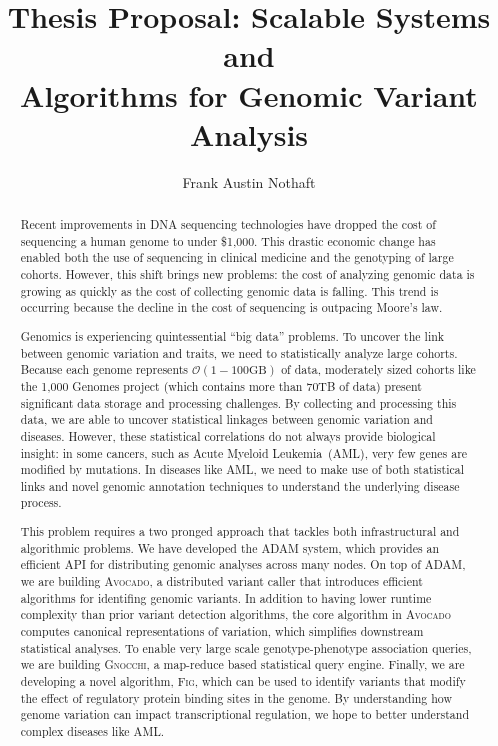\documentclass[11pt]{article} %
\begin{document}
\title{Thesis Proposal: Scalable Systems and \\ Algorithms for Genomic Variant Analysis}
\author{Frank Austin Nothaft} 
\date{}

\maketitle

\begin{abstract}

Recent improvements in DNA sequencing technologies have dropped the cost of sequencing a
human genome to under \$1,000. This drastic economic change has enabled both the use of
sequencing in clinical medicine and the genotyping of large cohorts. However, this shift
brings new problems: the cost of analyzing genomic data is growing as quickly as the cost
of collecting genomic data is falling. This trend is occurring because the decline in the
cost of sequencing is outpacing Moore's law.

Genomics is experiencing quintessential ``big data'' problems. To uncover the link between
genomic variation and traits, we need to statistically analyze large cohorts. Because each
genome represents $\mathcal{O}(1-100\text{GB})$ of data, moderately sized cohorts like the
1,000 Genomes project (which contains more than 70TB of data) present significant data
storage and processing challenges. By collecting and processing this data, we are able to
uncover statistical linkages between genomic variation and diseases. However, these statistical
correlations do not always provide biological insight: in some cancers, such as Acute
Myeloid Leukemia~(AML), very few genes are modified by mutations. In diseases like AML,
we need to make use of both statistical links and novel genomic annotation techniques to
understand the underlying disease process.

This problem requires a two pronged approach that tackles both infrastructural and
algorithmic problems. We have developed the \textsc{ADAM} system, which provides an efficient
API for distributing genomic analyses across many nodes. On top of \textsc{ADAM}, we are
building \textsc{Avocado}, a distributed variant caller that introduces efficient algorithms
for identifing genomic variants. In addition to having lower runtime complexity than prior
variant detection algorithms, the core algorithm in \textsc{Avocado} computes canonical
representations of variation, which simplifies downstream statistical analyses. To enable
very large scale genotype-phenotype association queries, we are building \textsc{Gnocchi},
a map-reduce based statistical query engine. Finally, we are developing a novel algorithm,
\textsc{Fig}, which can be used to identify variants that modify the effect of regulatory
protein binding sites in the genome. By understanding how genome variation can impact
transcriptional regulation, we hope to better understand complex diseases like AML.

\end{abstract}
\end{document}
